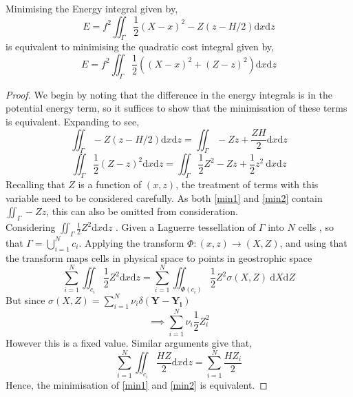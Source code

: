 \begin{lemma}
	Minimising the Energy integral given by,
	\begin{equation*}
	E = f^2 \iint_{\Gamma} \frac{1}{2}\left(X-x\right)^2 - Z\left(z - H/2\right)\textrm{d}x\textrm{d}z
	\end{equation*} 
	is equivalent to minimising the quadratic cost integral given by,
	\begin{equation*}
	E = f^2 \iint_{\Gamma} \frac{1}{2}\left(\left(X-x\right)^2 + \left(Z - z\right)^2\right)\textrm{d}x\textrm{d}z
	\label{energy1}
	\end{equation*}
	\label{energy lemma}
\end{lemma}
\begin{proof}
	We begin by noting that the difference in the energy integrals is in the potential energy term, so it suffices to show that the minimisation of these terms is equivalent. Expanding to see,
	\begin{equation}
	\iint_{\Gamma} - Z\left(z - H/2\right)\textrm{d}x\textrm{d}z = \iint_{\Gamma} - Zz + \frac{ZH}{2}\textrm{d}x\textrm{d}z
	\label{min1}
	\end{equation} 
	\begin{equation}
	\iint_{\Gamma} \frac{1}{2}\left(Z - z\right)^2\textrm{d}x\textrm{d}z = \iint_{\Gamma} \frac{1}{2}Z^2 - Zz + \frac{1}{2} z^2 \ \textrm{d}x\textrm{d}z
	\label{min2}  
	\end{equation}
	Recalling that $Z$ is a function of $(x,z)$, the treatment of terms with this variable need to be considered carefully. As both \ref{min1} and \ref{min2} contain $\iint_{\Gamma} - Zz$, this can also be omitted from consideration.\\
	\linebreak
	Considering $\iint_{\Gamma} \frac{1}{2}Z^2\textrm{d}x\textrm{d}z$ . Given a Laguerre tessellation of $\Gamma$ into $N$ cells , so that $\Gamma = \bigcup_{i=1}^N c_i$. Applying the transform $\Phi: (x,z) \rightarrow (X,Z)$, and using that the transform maps cells in physical space to points in geostrophic space
	\begin{equation*}
		\sum_{i=1}^N \iint_{c_i} \frac{1}{2}Z^2\textrm{d}x\textrm{d}z = \sum_{i=1}^N \iint_{\Phi(c_i)} \frac{1}{2}Z^2\sigma(X,Z) \ \textrm{d}X\textrm{d}Z 
	\end{equation*}
	But since $\sigma(X,Z) = \sum_{i=1}^{N} \nu_i \delta(\bm{Y}-\bm{Y_i})$
	\begin{equation*}
		\implies \sum_{i=1}^N \nu_i \frac{1}{2}Z_i^2
	\end{equation*}
	However this is a fixed value. Similar arguments give that,
	\begin{equation*}
		\sum_{i=1}^N \iint_{c_i} \frac{HZ}{2}\textrm{d}x\textrm{d}z = \sum_{i=1}^N \frac{HZ_i}{2}
	\end{equation*}
	Hence, the minimisation of \ref{min1} and \ref{min2} is equivalent.
\end{proof}
	
